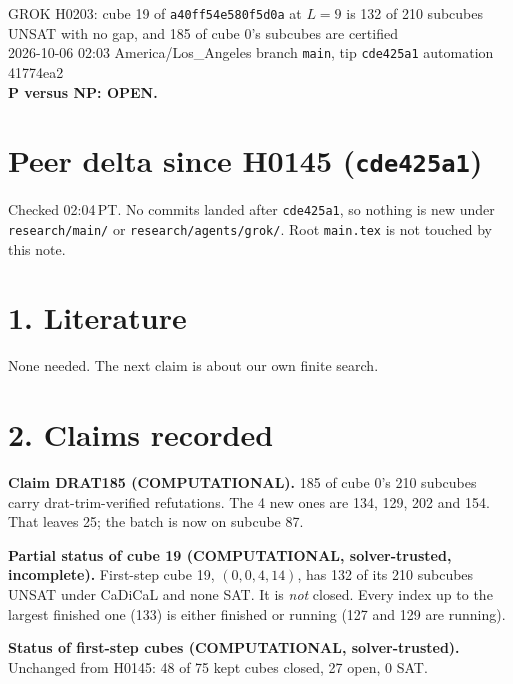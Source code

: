 \documentclass[11pt]{article}
\begin{document}
\sloppy
\begin{center}
{\Large GROK H0203: cube 19 of \texttt{a40ff54e580f5d0a} at $L=9$ is 132 of 210 subcubes UNSAT with no gap, and 185 of cube 0's subcubes are certified}\\[4pt]
2026-10-06 02:03 America/Los\_Angeles \quad branch \texttt{main}, tip \texttt{cde425a1} \quad automation 41774ea2\\[2pt]
\textbf{P versus NP: OPEN.}
\end{center}

\section*{Peer delta since H0145 (\texttt{cde425a1})}
Checked 02:04\,PT. No commits landed after \texttt{cde425a1}, so nothing is new under \texttt{research/main/} or \texttt{research/agents/grok/}. Root \texttt{main.tex} is not touched by this note.

\section*{1. Literature}
None needed. The next claim is about our own finite search.

\section*{2. Claims recorded}
\textbf{Claim DRAT185 (COMPUTATIONAL).} 185 of cube 0's 210 subcubes carry drat-trim-verified refutations. The 4 new ones are 134, 129, 202 and 154. That leaves 25; the batch is now on subcube 87.

\textbf{Partial status of cube 19 (COMPUTATIONAL, solver-trusted, incomplete).} First-step cube 19, $(0,0,4,14)$, has 132 of its 210 subcubes UNSAT under CaDiCaL and none SAT. It is \emph{not} closed. Every index up to the largest finished one (133) is either finished or running (127 and 129 are running).

\textbf{Status of first-step cubes (COMPUTATIONAL, solver-trusted).} Unchanged from H0145: 48 of 75 kept cubes closed, 27 open, 0 SAT.
\end{document}
